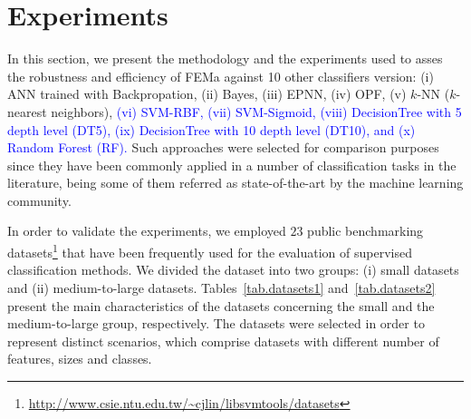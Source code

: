 \section{Experiments}
\label{s.methodology}

In this section, we present the methodology and the experiments used to asses the robustness and efficiency of FEMa against 10 other classifiers version: (i) ANN trained with Backpropation, (ii) Bayes, (iii) EPNN, (iv) OPF, (v) $k$-NN ($k$-nearest neighbors), \textcolor{blue}{(vi) SVM-RBF, (vii) SVM-Sigmoid, (viii) DecisionTree with 5 depth level (DT5), (ix) DecisionTree with 10 depth level (DT10), and (x) Random Forest (RF).} Such approaches were selected for comparison purposes since they have been commonly applied in a number of classification tasks in the literature, being some of them referred as state-of-the-art by the machine learning community.

In order to validate the experiments, we employed $23$ public benchmarking datasets\footnote{\url{http://www.csie.ntu.edu.tw/~cjlin/libsvmtools/datasets}} that have been frequently used for the evaluation of supervised classification methods. We divided the dataset into two groups: (i) small datasets and (ii) medium-to-large datasets. Tables~\ref{tab.datasets1} and~\ref{tab.datasets2} present the main characteristics of the datasets concerning the small and the medium-to-large group, respectively. The datasets were selected in order to represent distinct scenarios, which comprise datasets with different number of features, sizes and classes. 

